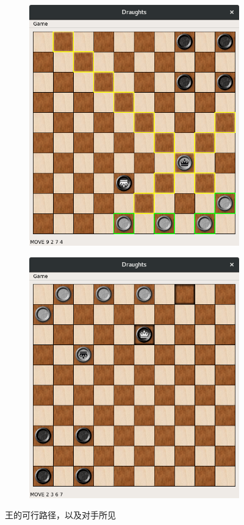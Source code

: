\documentclass[11pt,a4paper]{article}
\begin{document}
\begin{figure}[H]
	\centering
	\begin{subfigure}{.47\textwidth}
		\centering
		\includegraphics[width=\linewidth]{img5.png}
		\caption{}
	\end{subfigure}
	\hfill
	\begin{subfigure}{.47\textwidth}
		\centering
		\includegraphics[width=\linewidth]{img6.png}
		\caption{}
	\end{subfigure}
	\caption{王的可行路径，以及对手所见}
	\label{fig:3}
\end{figure}
\end{document}

